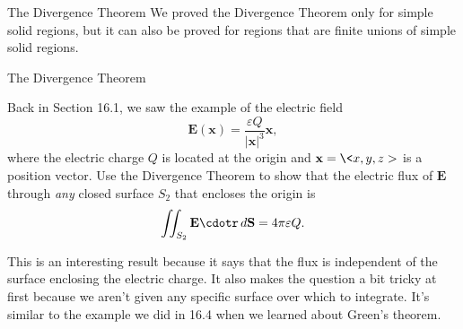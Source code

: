 \documentclass[11pt,english,
handout
]{beamer}
\begin{document}
\begin{frame}{The Divergence Theorem}
\small
We proved the Divergence Theorem only for simple solid regions, but it can also be proved for regions that are finite unions of simple solid regions.    

\begin{minipage}{0.3\textwidth}
\centering
{}
\end{minipage}\hspace{5mm}%
\begin{minipage}{0.65\textwidth}
\footnotesize
{}
\end{minipage}
\end{frame}




\begin{frame}[t]{The Divergence Theorem}
\small
\begin{example}
Back in Section 16.1, we saw the example of the electric field
\[
\mathbf{E}(\mathbf{x})=\frac{\varepsilon Q}{|\mathbf{x}|^3}\mathbf{x},
\]
where the electric charge $Q$ is located at the origin and $\mathbf{x}=\<x,y,z>$ is a position vector. Use the Divergence Theorem to show that the electric flux of $\mathbf{E}$ through \textit{any} closed surface $S_2$ that encloses the origin is
\[
\iint_{S_2}\mathbf{E}\cdotr\,d\mathbf{S}=4\pi\varepsilon Q.
\]
\pause

This is an interesting result because it says that the flux is independent of the surface enclosing the electric charge. It also makes the question a bit tricky at first because we aren't given any specific surface over which to integrate. It's similar to the example we did in 16.4 when we learned about Green's theorem.
\end{example}
\end{frame}
\end{document}
